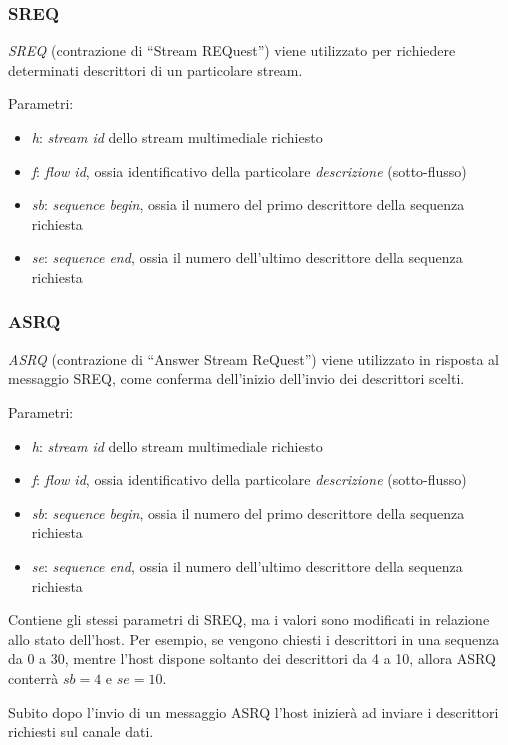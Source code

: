 \subsubsection*{SREQ}
%
\emph{SREQ} (contrazione di ``Stream REQuest'') viene utilizzato per richiedere
determinati descrittori di un particolare stream.

Parametri:
\begin{itemize}
  \item \emph{h}: \emph{stream id} dello stream multimediale richiesto
  \item \emph{f}: \emph{flow id}, ossia identificativo della particolare
  \emph{descrizione} (sotto-flusso)
  \item \emph{sb}: \emph{sequence begin}, ossia il numero del primo descrittore
  della sequenza richiesta
  \item \emph{se}: \emph{sequence end}, ossia il numero dell'ultimo descrittore
  della sequenza richiesta
\end{itemize}


\subsubsection*{ASRQ}
%
\emph{ASRQ} (contrazione di ``Answer Stream ReQuest'') viene utilizzato in
risposta al messaggio SREQ, come conferma dell'inizio dell'invio dei
descrittori scelti. 

Parametri:
\begin{itemize}
  \item \emph{h}: \emph{stream id} dello stream multimediale richiesto
  \item \emph{f}: \emph{flow id}, ossia identificativo della particolare
  \emph{descrizione} (sotto-flusso)
  \item \emph{sb}: \emph{sequence begin}, ossia il numero del primo descrittore
  della sequenza richiesta
  \item \emph{se}: \emph{sequence end}, ossia il numero dell'ultimo descrittore
  della sequenza richiesta
\end{itemize}

Contiene gli stessi parametri di SREQ, ma i valori sono
modificati in relazione allo stato dell'host. Per esempio, se vengono chiesti i
descrittori in una sequenza da 0 a 30, mentre l'host dispone soltanto dei
descrittori da 4 a 10, allora ASRQ conterrà $sb=4$ e $se=10$.

Subito dopo l'invio di un messaggio ASRQ l'host inizierà ad inviare i
descrittori richiesti sul canale dati.

